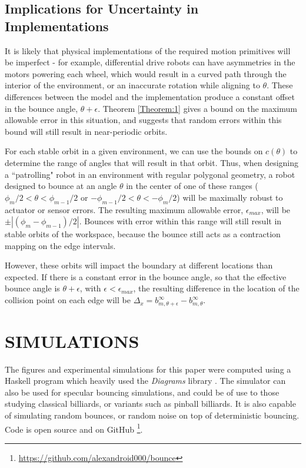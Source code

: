 \documentclass[letterpaper, 10 pt, conference]{ieeeconf}  %
\begin{document}
\subsection{Implications for Uncertainty in Implementations}
It is likely that physical implementations of the required motion primitives
will be imperfect - for example, differential drive robots can have asymmetries
in the motors powering each wheel, which would result in a curved path
through the interior of the environment, or an inaccurate rotation
while aligning to $\theta$. These differences between the model and 
the implementation produce a constant offset in the bounce angle, $\theta + \epsilon$. 
Theorem \ref{Theorem:1} gives a bound on the maximum allowable error in this
situation, and suggests that random errors within this bound will still result
in near-periodic orbits.

For each stable orbit in a given environment, we can use the bounds on
$c(\theta)$ to determine the range of angles that will result in that orbit. 
Thus, when designing a ``patrolling" robot in an environment with regular polygonal
geometry, a robot designed to bounce at an angle $\theta$ in the center of one of these
ranges ($ \phi_m/2< \theta < \phi_{m-1}/2$ or $-\phi_{m-1}/2 < \theta <
-\phi_m/2$) will be maximally robust to actuator or sensor errors. The resulting
maximum allowable error, $\epsilon_{max}$, will be $\pm | (\phi_m - \phi_{m-1})/2 |$.
Bounces with error within this range will still result in stable orbits of the
workspace, because the bounce still acts as a contraction mapping on the edge
intervals.

However, these orbits will impact the boundary at
different locations than expected. If there is a constant error in the bounce
angle, so that the effective bounce angle is $\theta + \epsilon$, with $\epsilon
< \epsilon_{max}$, the resulting difference in the location of the collision point
on each edge will be $\Delta_x = b_{m,\theta + \epsilon}^{\infty} - b_{m,\theta}^{\infty}$.


\section{SIMULATIONS}
The figures and experimental simulations for this paper were computed using a
Haskell program which heavily used the
\textit{Diagrams} library \cite{yorgey2012monoids}. 
The simulator can also be used for specular bouncing simulations, and could be
of use to those studying classical billiards, or variants such as pinball billiards.
It is also capable of simulating random bounces, or random noise on top of  
deterministic bouncing. Code is open source and on GitHub
\footnote{\url{https://github.com/alexandroid000/bounce}}.
\end{document}
